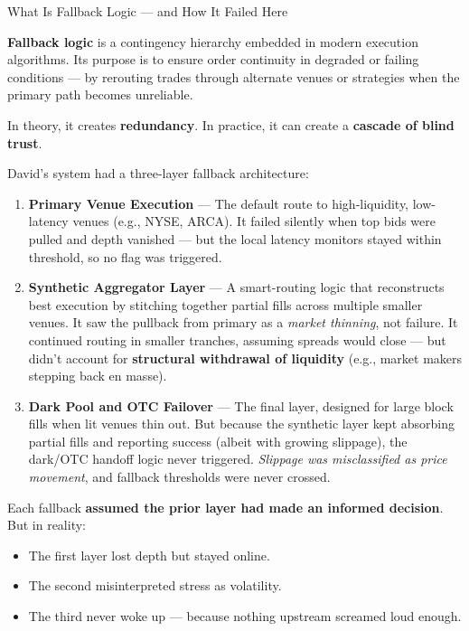 \medskip

\begin{TechnicalSidebar}{What Is Fallback Logic — and How It Failed Here}

  \textbf{Fallback logic} is a contingency hierarchy embedded in modern execution algorithms.  
  Its purpose is to ensure order continuity in degraded or failing conditions — by rerouting trades through alternate venues or strategies when the primary path becomes unreliable.
  
  \medskip
  
  In theory, it creates \textbf{redundancy}.  
  In practice, it can create a \textbf{cascade of blind trust}.
  
  \medskip
  
  David’s system had a three-layer fallback architecture:
  
  \begin{enumerate}
    \item \textbf{Primary Venue Execution} — The default route to high-liquidity, low-latency venues (e.g., NYSE, ARCA).  
          It failed silently when top bids were pulled and depth vanished — but the local latency monitors stayed within threshold, so no flag was triggered.
  
    \item \textbf{Synthetic Aggregator Layer} — A smart-routing logic that reconstructs best execution by stitching together partial fills across multiple smaller venues.  
          It saw the pullback from primary as a \textit{market thinning}, not failure.  
          It continued routing in smaller tranches, assuming spreads would close — but didn’t account for \textbf{structural withdrawal of liquidity} (e.g., market makers stepping back en masse).
  
    \item \textbf{Dark Pool and OTC Failover} — The final layer, designed for large block fills when lit venues thin out.  
          But because the synthetic layer kept absorbing partial fills and reporting success (albeit with growing slippage), the dark/OTC handoff logic never triggered.  
          \textit{Slippage was misclassified as price movement}, and fallback thresholds were never crossed.
  \end{enumerate}
  
  \medskip
  
  Each fallback \textbf{assumed the prior layer had made an informed decision}.  
  But in reality:
  
  \begin{itemize}
    \item The first layer lost depth but stayed online.  
    \item The second misinterpreted stress as volatility.  
    \item The third never woke up — because nothing upstream screamed loud enough.
  

\end{itemize}
\end{TechnicalSidebar}
